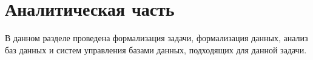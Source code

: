 \section{Аналитическая часть}

\noindent
\hspace{0.75cm}
В данном разделе проведена формализация задачи, формализация данных, анализ баз данных и систем управления базами данных, подходящих для данной задачи.